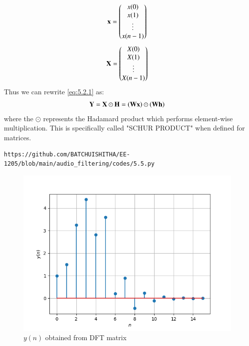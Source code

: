\documentclass[journal,12pt,twocolumn]{IEEEtran}
\theoremstyle{remark}
\begin{document}
\begin{enumerate}[label=\thesection.\arabic*]
\begin{align}
	\mathbf{x} = 
	\begin{pmatrix}
		x(0) \\ x(1) \\ \vdots \\ x(n - 1)
	\end{pmatrix}
\end{align}
\begin{align}
	\mathbf{X} = 
	\begin{pmatrix}
		X(0) \\ X(1) \\ \vdots \\ X(n - 1)
	\end{pmatrix}
\end{align}
Thus we can rewrite  \eqref{eq:5.2.1} as:
\begin{align}
	\mathbf{Y} = \mathbf{X}\odot\mathbf{H} = \left(\mathbf{W}\mathbf{x}\right)\odot\left(\mathbf{W}\mathbf{h}\right)
\end{align}
where the $\odot$ represents the Hadamard product which performs element-wise multiplication.
This is specifically called "SCHUR PRODUCT" when defined for matrices.
\begin{lstlisting}
https://github.com/BATCHUISHITHA/EE-1205/blob/main/audio_filtering/codes/5.5.py
\end{lstlisting}
\begin{figure}[ht]
	\centering
	\includegraphics[width=0.8\columnwidth]{figs/5.5.png}
	\caption{$y(n)$ obtained from DFT matrix }
	\label{fig:5.5}
\end{figure}
\end{enumerate}
\end{document}
